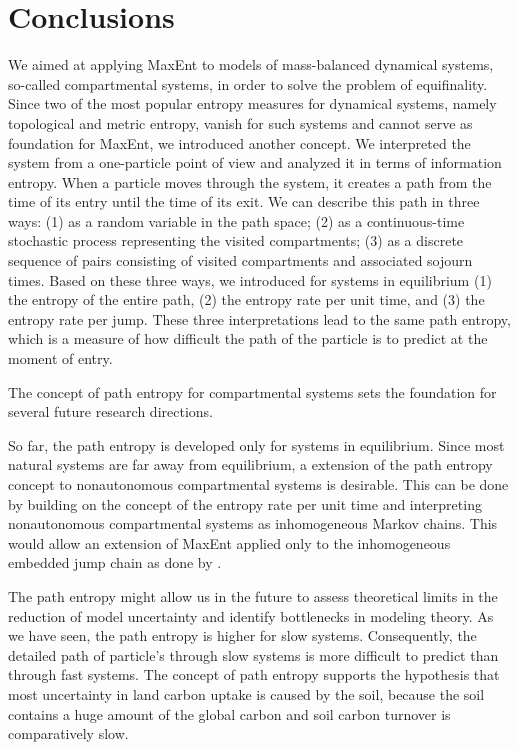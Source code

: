 \documentclass[smallextended]{svjour3}
\begin{document}
\section{Conclusions}
We aimed at applying MaxEnt to models of mass-balanced dynamical systems, so-called compartmental systems, in order to solve the problem of equifinality.
Since two of the most popular entropy measures for dynamical systems, namely topological and metric entropy, vanish for such systems and cannot serve as foundation for MaxEnt, we introduced another concept.
We interpreted the system from a one-particle point of view and analyzed it in terms of information entropy.
When a particle moves through the system, it creates a path from the time of its entry until the time of its exit.
We can describe this path in three ways: (1) as a random variable in the path space; (2) as a continuous-time stochastic process representing the visited compartments; (3) as a discrete sequence of pairs consisting of visited compartments and associated sojourn times. 
Based on these three ways, we introduced for systems in equilibrium (1) the entropy of the entire path, (2) the entropy rate per unit time, and (3) the entropy rate per jump. 
These three interpretations lead to the same path entropy, which is a measure of how difficult the path of the particle is to predict at the moment of entry.

The concept of path entropy for compartmental systems sets the foundation for several future research directions.

So far, the path entropy is developed only for systems in equilibrium.
Since most natural systems are far away from equilibrium, a extension of the path entropy concept to nonautonomous compartmental systems is desirable.
This can be done by building on the concept of the entropy rate per unit time and interpreting nonautonomous compartmental systems as inhomogeneous Markov chains.
This would allow an extension of MaxEnt applied only to the inhomogeneous embedded jump chain as done by \citet{Ge2012JCP}.

The path entropy might allow us in the future to assess theoretical limits in the reduction of model uncertainty and identify bottlenecks in modeling theory.
As we have seen, the path entropy is higher for slow systems.
Consequently, the detailed path of particle's through slow systems is more difficult to predict than through fast systems.
The concept of path entropy supports the hypothesis that most uncertainty in land carbon uptake \citep{Friedlingstein2006JC, Friedlingstein2013JC} is caused by the soil, 
because the soil contains a huge amount of the global carbon and soil carbon turnover is comparatively slow.
\end{document}
